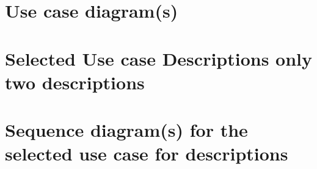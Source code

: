 \documentclass[11pt]{article}
\begin{document}


%


    \section{Use case diagram(s)}\label{sec:use-case-diagram(s)}


    \section{Selected Use case Descriptions {only two descriptions}}\label{sec:selected-use-case-descriptions}


    \section{Sequence diagram(s) {for the selected use case for descriptions}}\label{sec:sequence-diagram(s)}
\end{document}
